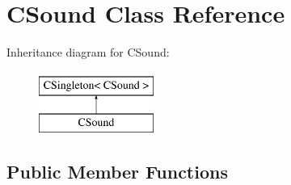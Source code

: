 \hypertarget{class_c_sound}{
\section{CSound Class Reference}
\label{class_c_sound}
}
Inheritance diagram for CSound:\begin{figure}[H]
\begin{center}
\leavevmode
\includegraphics[height=2cm]{class_c_sound}
\end{center}
\end{figure}
\subsection*{Public Member Functions}
